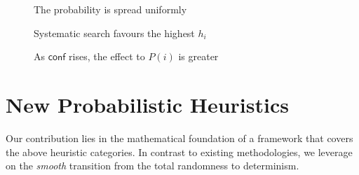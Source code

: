 \documentclass{ws-ijait}
\begin{document}
\begin{figure}
  \centering
  
  \caption{The probability is spread
           uniformly\label{uniform}}
\end{figure}

\begin{figure}
  \centering
  
  \caption{Systematic search favours the highest
           $h_i$\label{systematic}}
\end{figure}

\begin{figure}
  \centering
  
  \caption{As $\mathsf{conf}$ rises, the effect to $P(i)$ is
           greater\label{conf}}
\end{figure}


\section{New Probabilistic Heuristics}

Our contribution lies in the mathematical foundation of a
framework that covers the above heuristic categories. In
contrast to existing methodologies, we leverage on the
\emph{smooth} transition from the total randomness to
determinism.
\end{document}
